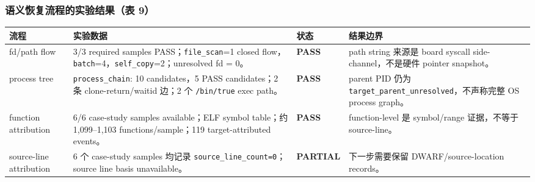 \documentclass[aspectratio=169,10pt]{beamer}
\newcommand{\tagok}[1]{\textcolor{rvgreen}{\textbf{#1}}}
\newcommand{\tagwarn}[1]{\textcolor{rvorange}{\textbf{#1}}}
\begin{document}
\begin{frame}
  \frametitle{语义恢复流程的实验结果（表 9）}
  \vskip0.05cm
  \begin{center}\scriptsize
  \renewcommand{\arraystretch}{1.13}
  \begin{tabularx}{0.97\linewidth}{@{}L{2.75cm}L{3.45cm}L{2.15cm}Y@{}}
    \toprule
    \textbf{流程} & \textbf{实验数据} & \textbf{状态} & \textbf{结果边界} \\
    \midrule
    fd/path flow & 3/3 required samples PASS；\texttt{file\_scan}=1 closed flow，\texttt{batch}=4，\texttt{self\_copy}=2；unresolved fd = 0。 & \tagok{PASS} & path string 来源是 board syscall side-channel，不是硬件 pointer snapshot。 \\
    process tree & \texttt{process\_chain}: 10 candidates，5 PASS candidates；2 条 clone-return/waitid 边；2 个 \texttt{/bin/true} exec path。 & \tagok{PASS} & parent PID 仍为 \texttt{target\_parent\_unresolved}，不声称完整 OS process graph。 \\
    function attribution & 6/6 case-study samples available；ELF symbol table；约 1,099--1,103 functions/sample；119 target-attributed events。 & \tagok{PASS} & function-level 是 symbol/range 证据，不等于 source-line。 \\
    source-line attribution & 6 个 case-study samples 均记录 \texttt{source\_line\_count=0}；source line basis unavailable。 & \tagwarn{PARTIAL} & 下一步需要保留 DWARF/source-location records。 \\
    \bottomrule
  \end{tabularx}
  \end{center}
\end{frame}
\end{document}
